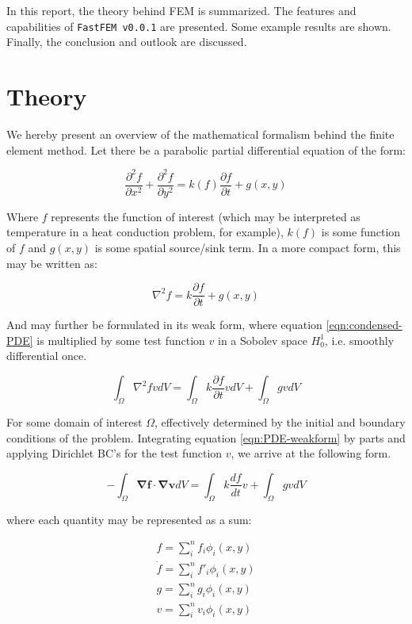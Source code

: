 \documentclass[headings=standardclasses, abstract=true]{scrartcl}
\begin{document}
In this report, the theory behind FEM is summarized. The features and capabilities of \texttt{FastFEM v0.0.1} are presented. Some example results are shown. Finally, the conclusion and outlook are discussed.

\section{Theory}
We hereby present an overview of the mathematical formalism behind the finite element method. Let there be a parabolic partial differential equation of the form:

\begin{equation}
\frac{\partial^2 f}{\partial x^2} + \frac{\partial^2 f}{\partial y^2} = k(f) \frac{\partial f}{\partial t} + g(x,y)
\end{equation}

Where $f$ represents the function of interest (which may be interpreted as temperature in a heat conduction problem, for example), $k(f)$ is some function of $f$ and $g(x,y)$ is some spatial source/sink term. In a more compact form, this may be written as:

\begin{equation}
\nabla^2 f  = k\frac{\partial f}{\partial t} + g(x,y) \label{eqn:condensed-PDE}
\end{equation}

And may further be formulated in its weak form, where equation \ref{eqn:condensed-PDE} is multiplied by some test function $v$ in a Sobolev space $H_0^1$, i.e. smoothly differential once.

\begin{equation}
\int_\Omega \nabla^2 f v dV = \int_\Omega k \frac{\partial f}{\partial t}v dV + \int_\Omega gv dV \label{eqn:PDE-weakform}
\end{equation}

For some domain of interest $\Omega$, effectively determined by the initial and boundary conditions of the problem. Integrating equation \ref{eqn:PDE-weakform} by parts and applying Dirichlet BC's for the test function $v$, we arrive at the following form.

\begin{equation}
- \int_\Omega \mathbf{\nabla f} \cdot \mathbf{\nabla v} dV = \int_\Omega k \frac{df}{dt} v + \int_\Omega gv dV
\end{equation}

where each quantity may be represented as a sum:

\begin{align}
f = \sum_i^n f_i \phi_i(x,y) \nonumber \\
\dot{f} =  \sum_i^n f'_i \phi_i(x,y) \nonumber \\
g = \sum_i^n g_i \phi_i(x,y) \nonumber \\
v = \sum_i^n v_i \phi_i(x,y) \nonumber
\end{align}
\end{document}
